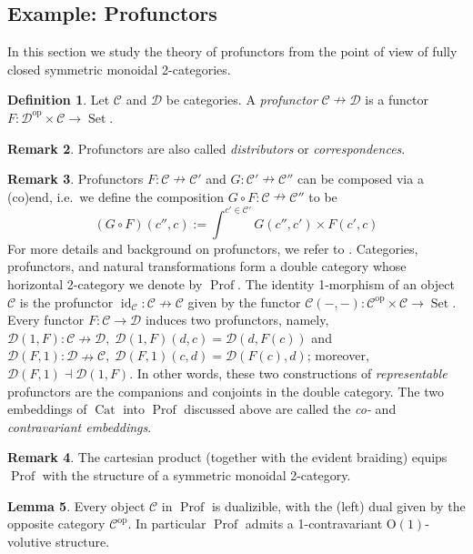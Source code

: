 \documentclass{article}
\newcommand{\Prof}{\operatorname{Prof}}%
\newcommand{\opp}{\operatorname{op}}%
\newcommand{\id}{\operatorname{id}}%
\newcommand{\Cat}{\operatorname{Cat}}%
\newcommand{\Set}{\operatorname{Set}}%
\newcommand{\Oone}{\operatorname{O(1)}}
\newcommand{\C}{\mathcal{C}}
\newcommand{\D}{\mathcal{D}}
\numberwithin{equation}{section}
\theoremstyle{definition}
\newtheorem{definition}{Definition}[subsection]
\newtheorem{lemma}[definition]{Lemma}
\newtheorem{remark}[definition]{Remark}
\theoremstyle{theorem}
\begin{document}
\subsection{Example: Profunctors}\label{Subsection:Profunctors}
In this section we study the theory of profunctors from the point of view of fully closed symmetric monoidal 2-categories.
\begin{definition}
    Let $\C$ and $\D$ be categories. A \emph{profunctor} $\C \nrightarrow \D$ is a functor $F \colon \D^{\opp} \times \C \to \Set$.
\end{definition}
\begin{remark}
    Profunctors are also called \emph{distributors} or \emph{correspondences}. 
\end{remark}
\begin{remark}\label{Remark: the double category of profunctors}
    Profunctors $F \colon \C \nrightarrow \C'$ and $G \colon \C' \nrightarrow \C''$ can be composed via a (co)end, i.e.\ we define the 
    composition $G \circ F \colon \C \nrightarrow \C''$ to be 
    \begin{equation}
    (G \circ F)(c'',c) := \int^{c' \in \C'} G(c'',c') \times F(c',c)
    \end{equation}
    For more details and background on profunctors, we refer to \cite[Section 5]{Loregian2021}. 
    Categories, profunctors, and natural transformations form a double category whose horizontal 2-category we denote by $\Prof$. The identity 
    1-morphism of an object $\C$ is the profunctor $\id_{\C} \colon \C \nrightarrow \C$ given by the functor $\C(-,-) \colon \C^{\opp} \times \C \to \Set$. 
    Every functor $F \colon \C \to \D$ induces two profunctors, namely, $\D(1,F) \colon \C \nrightarrow \D,\; \D(1,F)(d,c) = \D(d,F(c))$
    and $\D(F,1) \colon \D \nrightarrow \C,\; \D(F,1)(c,d) = \D(F(c),d)$; moreover, $\D(F,1) \dashv \D(1,F)$. In other words, 
    these two constructions of \emph{representable} profunctors are the companions and conjoints in the double category. 
    The two embeddings of $\Cat$ into $\Prof$ discussed above are called the \emph{co-} and \emph{contravariant embeddings}.
\end{remark}
\begin{remark}
    The cartesian product (together with the evident braiding) equips $\Prof$ with the structure of a symmetric monoidal 2-category.
\end{remark}
\begin{lemma}\label{Lemma: Prof is rigid}
    Every object $\C$ in $\Prof$ is dualizible, with the (left) dual given by the opposite category $\C^{\opp}$. In particular $\Prof$ admits a 1-contravariant 
    $\Oone$-volutive structure.
\end{lemma}
\end{document}
